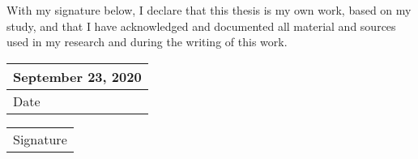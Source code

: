 \vspace{150 pt}
\begin{center}
    \begin{flushleft}
        With my signature below, I declare that this thesis is my own work, based on my study, and that I have acknowledged and documented all material and sources used in my research and during the writing of this work.
    \end{flushleft}
    
    \vspace{180 pt}

    \begin{tabular}{ l }
         September 23, 2020 \\
         \hline
         Date \hspace{80 pt}    
    \end{tabular}
    \quad
    \begin{tabular}{ l }
         \\
         \hline
         Signature \hspace{100 pt}   
    \end{tabular}
\end{center}